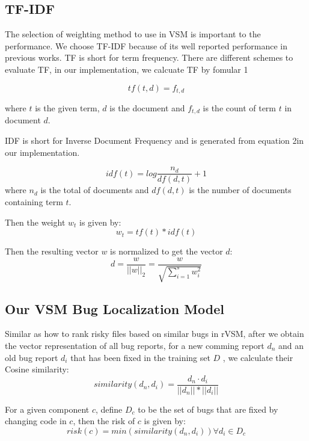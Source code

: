 \subsection{TF-IDF}
The selection of weighting method to use in VSM is important to the performance. 
We choose TF-IDF\cite{salton1988term} because of its well reported performance in previous works.
TF is short for term frequency. 
There are different schemes to evaluate TF, in our implementation, we calcuate TF by fomular 1

\begin{equation}
	tf(t,d) = f_{t,d}
\end{equation}

where $t$ is the given term, $d$ is the document and $f_{t,d}$ is the count of term $t$ in document $d$.

IDF is short for Inverse Document Frequency and is generated from equation 2in our implementation.

\begin{equation}
	idf(t) = log\frac{n_d}{df(d,t)} +1
\end{equation}
where $n_d$ is the total of documents and $df(d,t)$ is the number of documents containing term $t$.

Then the weight $w_t$ is given by:
\begin{equation}
	w_t = tf(t)*idf(t)
\end{equation}
 
Then the resulting vector $w$ is normalized to get the vector $d$:
\begin{equation}
	d = \frac{w}{||w||_2} = \frac{w}{\sqrt{\sum_{i=1}^{s}w_i^2}}
\end{equation} 


\subsection{Our VSM Bug Localization Model}
Similar as how to rank risky files based on similar bugs in rVSM\cite{zhou2012should},
after we obtain the vector representation of all bug reports, for a new comming report $d_n$ and an old bug report $d_i$ that has been fixed in the training set $D$ , we calculate their Cosine similarity:
\begin{equation}
	similarity(d_n,d_i) = \frac{d_n \cdot d_i}{||d_n||*||d_i||}
\end{equation}

For a given component $c$, define $D_c$ to be the set of bugs that are fixed by changing code in $c$,  then the risk of $c$ is given by:
\begin{equation}
	risk(c) = min(similarity(d_n,d_i)) \forall d_i \in D_c
\end{equation}

